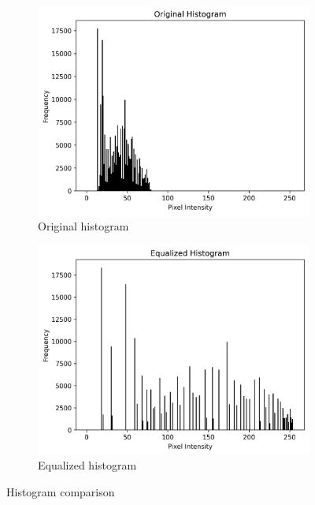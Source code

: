 \documentclass[10pt,a4paper]{article}
\begin{document}
\begin{figure}[H]
    \centering
    \begin{subfigure}{0.48\textwidth}
        \includegraphics[width=\textwidth]{task5/3_original_histogram.png}
        \caption{Original histogram}
    \end{subfigure}
    \hfill
    \begin{subfigure}{0.48\textwidth}
        \includegraphics[width=\textwidth]{task5/4_equalized_histogram.png}
        \caption{Equalized histogram}
    \end{subfigure}
    \caption{Histogram comparison}
\end{figure}
\end{document}
